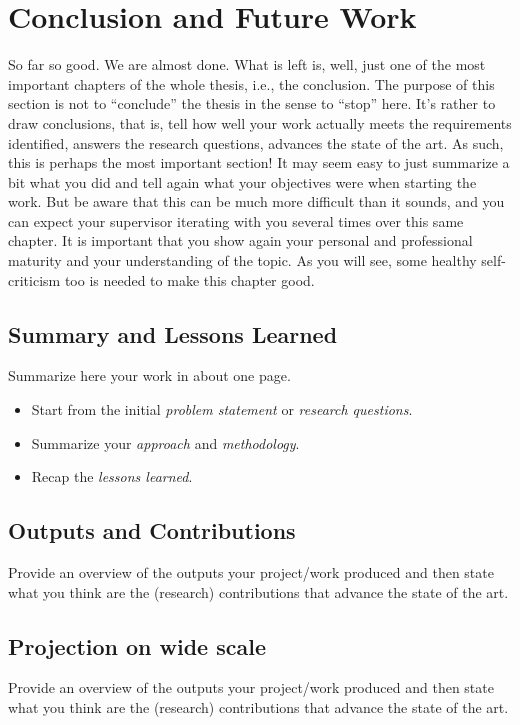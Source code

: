 \chapter{Conclusion and Future Work}
\label{capitolo8}
\thispagestyle{empty}


So far so good. We are almost done. What is left is, well, just one of the most important chapters of the whole thesis, i.e., the conclusion. The purpose of this section is not to ``conclude'' the thesis in the sense to ``stop'' here. It's rather to draw conclusions, that is, tell how well your work actually meets the requirements identified, answers the research questions, advances the state of the art. As such, this is perhaps the most important section! It may seem easy to just summarize a bit what you did and tell again what your objectives were when starting the work. But be aware that this can be much more difficult than it sounds, and you can expect your supervisor iterating with you several times over this same chapter. It is important that you show again your personal and professional maturity and your understanding of the topic. As you will see, some healthy self-criticism too is needed to make this chapter good.

\section{Summary and Lessons Learned}
Summarize here your work in about one page.

\begin{itemize}
\item[\Square] Start from the initial \emph{problem statement} or \emph{research questions}.
\item[\Square] Summarize your \emph{approach} and \emph{methodology}.
\item[\Square] Recap the \emph{lessons learned}.
\end{itemize}


\section{Outputs and Contributions}
Provide an overview of the outputs your project/work produced and then state what you think are the (research) contributions that advance the state of the art. 

\section{Projection on wide scale}
Provide an overview of the outputs your project/work produced and then state what you think are the (research) contributions that advance the state of the art. 

